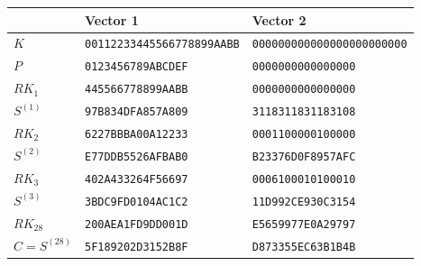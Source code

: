 \documentclass[11pt,a4paper]{article}
\theoremstyle{definition}
\theoremstyle{remark}
\begin{document}
\begin{center}\small
\begin{tabular}{lll}
\toprule
 & Vector 1 & Vector 2\\
\midrule
$K$ & \texttt{00112233445566778899AABB} & \texttt{000000000000000000000000}\\
$P$ & \texttt{0123456789ABCDEF} & \texttt{0000000000000000}\\
$RK_1$ & \texttt{445566778899AABB} & \texttt{0000000000000000}\\
$S^{(1)}$ & \texttt{97B834DFA857A809} & \texttt{3118311831183108}\\
$RK_2$ & \texttt{6227BBBA00A12233} & \texttt{0001100000100000}\\
$S^{(2)}$ & \texttt{E77DDB5526AFBAB0} & \texttt{B23376D0F8957AFC}\\
$RK_3$ & \texttt{402A433264F56697} & \texttt{0006100010100010}\\
$S^{(3)}$ & \texttt{3BDC9FD0104AC1C2} & \texttt{11D992CE930C3154}\\
$RK_{28}$ & \texttt{200AEA1FD9DD001D} & \texttt{E5659977E0A29797}\\
$C=S^{(28)}$ & \texttt{5F189202D3152B8F} & \texttt{D873355EC63B1B4B}\\
\bottomrule
\end{tabular}
\end{center}



\end{document}
